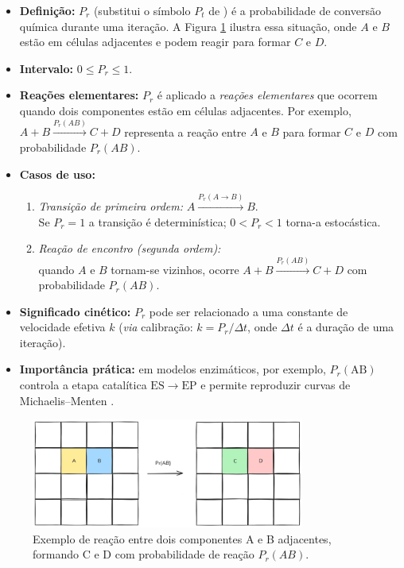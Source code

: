 \documentclass[12pt,oneside]{report}
\begin{document}
\begin{itemize}
    \item \textbf{Definição:} $P_r$ (substitui o símbolo $P_t$ de
          \citeauthor{kier2005}) é a probabilidade de conversão química
          durante uma iteração. A Figura \ref{fig:reacao} ilustra essa situação, onde $A$ e $B$ estão em células adjacentes e podem reagir para formar $C$ e $D$.
    \item \textbf{Intervalo:} $0 \le P_r \le 1$.
    \item \textbf{Reações elementares:} $P_r$ é aplicado a
          \emph{reações elementares} que ocorrem quando
          dois componentes estão em células adjacentes.
          Por exemplo, $A+B \xrightarrow{P_r(AB)} C+D$
          representa a reação entre $A$ e $B$ para formar $C$ e $D$ com probabilidade $P_r(AB)$.
    \item \textbf{Casos de uso:}
          \begin{enumerate}
              \item \emph{Transição de primeira ordem:}
                    $A \xrightarrow{P_r(A\rightarrow B)} B$.\\
                    Se $P_r=1$ a transição é determinística;
                    $0<P_r<1$ torna-a estocástica.
              \item \emph{Reação de encontro (segunda ordem):}\\
                    quando $A$ e $B$ tornam-se vizinhos,
                    ocorre $A+B \xrightarrow{P_r(AB)} C+D$
                    com probabilidade $P_r(AB)$.
          \end{enumerate}
    \item \textbf{Significado cinético:} $P_r$ pode ser relacionado a
          uma constante de velocidade efetiva $k$
          (\textit{via} calibração: $k = P_r/\Delta t$,
          onde $\Delta t$ é a duração de uma iteração).
    \item \textbf{Importância prática:}
          em modelos enzimáticos, por exemplo, $P_r(\mathrm{AB})$
          controla a etapa catalítica $\mathrm{ES}\rightarrow\mathrm{EP}$
          e permite reproduzir curvas de Michaelis–Menten
          \cite[cap.~9]{kier2005}.
\end{itemize}

\begin{figure}[H]
    \centering
    \includegraphics[width=0.8\textwidth]{reacao.png}
    \caption{\small Exemplo de reação entre dois componentes A e B adjacentes, formando C e D com probabilidade de reação $P_r(AB)$.}
    \label{fig:reacao}
\end{figure}
\end{document}

